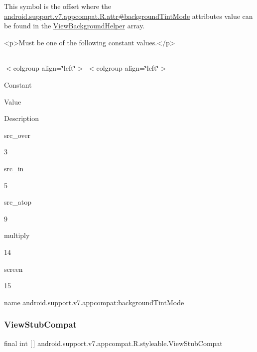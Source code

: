 This symbol is the offset where the \hyperlink{classandroid_1_1support_1_1v7_1_1appcompat_1_1R_1_1attr_a11663679360aa87a90983ccadc18c5ee}{android.\+support.\+v7.\+appcompat.\+R.\+attr\#background\+Tint\+Mode} attribute\textquotesingle{}s value can be found in the \hyperlink{classandroid_1_1support_1_1v7_1_1appcompat_1_1R_1_1styleable_a41b23c720259f27b563271bda1b5767a}{View\+Background\+Helper} array.

\begin{DoxyVerb}      <p>Must be one of the following constant values.</p>
\end{DoxyVerb}
 \tabulinesep=1mm
\begin{longtabu} spread 0pt [c]{*{0}{|X[-1]}|}
\hline
\end{longtabu}
$<$colgroup align=\char`\"{}left\char`\"{}$>$ $<$colgroup align=\char`\"{}left\char`\"{}$>$ 

Constant

Value

Description 

{\ttfamily src\+\_\+over}

3

{\ttfamily src\+\_\+in}

5

{\ttfamily src\+\_\+atop}

9

{\ttfamily multiply}

14

{\ttfamily screen}

15

name android.\+support.\+v7.\+appcompat\+:background\+Tint\+Mode \mbox{\label{classandroid_1_1support_1_1v7_1_1appcompat_1_1R_1_1styleable_a59b69ba1b80ee4157819f6b964a66358}} 
\subsubsection{\texorpdfstring{View\+Stub\+Compat}{ViewStubCompat}}
{\footnotesize\ttfamily final int \mbox{[}$\,$\mbox{]} android.\+support.\+v7.\+appcompat.\+R.\+styleable.\+View\+Stub\+Compat\hspace{0.3cm}{\ttfamily [static]}}

